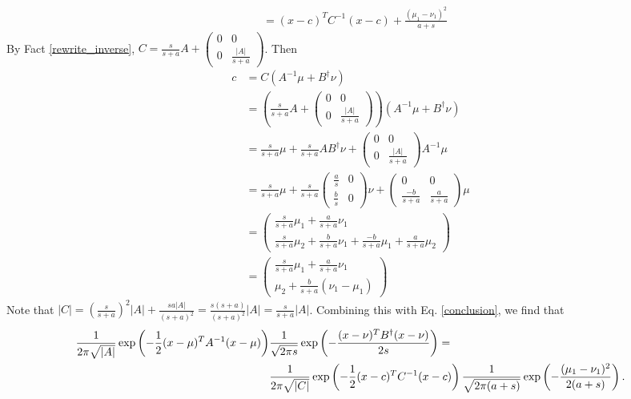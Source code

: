 \documentclass{article}
\begin{document}
\begin{pf}
\begin{align}
\\&=(x-c)^TC^{-1}(x-c)+\frac{(\mu_1-\nu_1)^2}{a+s} \label{conclusion}
\end{align}
By Fact \ref{rewrite_inverse}, $C=\frac{s}{s+a}A+\left(\begin{array}{cc}0 & 0 \\ 0 & \frac{|A|}{s+a} \end{array}\right)$. Then
\begin{align*}
c&=C(A^{-1}\mu+B^\dagger\nu)
\\&=\left(\frac{s}{s+a}A+\left(\begin{array}{cc}0 & 0 \\ 0 & \frac{|A|}{s+a} \end{array}\right)\right)(A^{-1}\mu+B^\dagger\nu)
\\&=\frac{s}{s+a}\mu+\frac{s}{s+a}AB^\dagger\nu+\left(\begin{array}{cc}0 & 0 \\ 0 & \frac{|A|}{s+a} \end{array}\right)A^{-1}\mu
\\&=\frac{s}{s+a}\mu+\frac{s}{s+a}\left(\begin{array}{cc}\frac{a}{s} & 0 \\ \frac{b}{s} & 0 \end{array}\right)\nu+\left(\begin{array}{cc}0 & 0 \\ \frac{-b}{s+a} & \frac{a}{s+a} \end{array}\right)\mu
\\&=\left(\begin{array}{c}\frac{s}{s+a}\mu_1+\frac{a}{s+a}\nu_1 
\\\frac{s}{s+a}\mu_2+\frac{b}{s+a}\nu_1+\frac{-b}{s+a}\mu_1+\frac{a}{s+a}\mu_2
\end{array}\right)
\\&=\left(\begin{array}{c}\frac{s}{s+a}\mu_1+\frac{a}{s+a}\nu_1 
\\\mu_2+\frac{b}{s+a}(\nu_1-\mu_1)
\end{array}\right)
\end{align*}
Note that $|C|=(\frac{s}{s+a})^2|A|+\frac{sa|A|}{(s+a)^2}=\frac{s(s+a)}{(s+a)^2}|A|=\frac{s}{s+a}|A|$. Combining this with Eq. \ref{conclusion}, we find that  
\begin{align*}
\frac{1}{2\pi\sqrt{|A|}}\exp\left(-\frac{1}{2}(x-\mu)^TA^{-1}(x-\mu)\right)&\frac{1}{\sqrt{2\pi s}}\exp\left(-\frac{(x-\nu)^TB^\dagger(x-\nu)}{2s}\right)= \notag
\\&\frac{1}{2\pi\sqrt{|C|}}\exp\left(-\frac{1}{2}(x-c)^TC^{-1}(x-c)\right)\frac{1}{\sqrt{2\pi(a+s)}}\exp\left(-\frac{(\mu_1-\nu_1)^2}{2(a+s)}\right).
\end{align*}
\end{pf}




\end{document}
